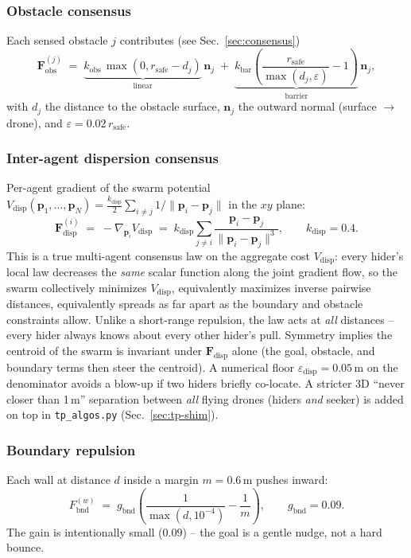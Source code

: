 \documentclass[11pt,a4paper]{article}
\newcommand{\code}[1]{\texttt{#1}}
\newcommand{\vect}[1]{\mathbf{#1}}
\begin{document}
\subsubsection*{Obstacle consensus}
Each sensed obstacle $j$ contributes (see Sec.~\ref{sec:consensus})
\[
    \vect{F}^{(j)}_\mathrm{obs} \;=\;
    \underbrace{k_\mathrm{obs}\,\max(0, r_\mathrm{safe} - d_j)}_{\text{linear}}
    \,\vect{n}_j
    \;+\;
    \underbrace{k_\mathrm{bar}\!\left(\frac{r_\mathrm{safe}}{\max(d_j,\varepsilon)} - 1\right)}_{\text{barrier}}
    \,\vect{n}_j,
\]
with $d_j$ the distance to the obstacle surface, $\vect{n}_j$ the outward
normal (surface $\to$ drone), and $\varepsilon = 0.02\,r_\mathrm{safe}$.

\subsubsection*{Inter-agent dispersion consensus}
\label{sec:disp-force}
Per-agent gradient of the swarm potential
$V_\mathrm{disp}(\vect{p}_1,\dots,\vect{p}_N) = \tfrac{k_\mathrm{disp}}{2}
\sum_{i \ne j} 1/\|\vect{p}_i - \vect{p}_j\|$ in the $xy$ plane:
\[
    \vect{F}^{(i)}_\mathrm{disp}
    \;=\; -\nabla_{\vect{p}_i} V_\mathrm{disp}
    \;=\; k_\mathrm{disp} \sum_{j \ne i}
          \frac{\vect{p}_i - \vect{p}_j}{\|\vect{p}_i - \vect{p}_j\|^{3}},
    \qquad k_\mathrm{disp} = 0.4.
\]
This is a true multi-agent consensus law on the aggregate cost $V_\mathrm{disp}$:
every hider's local law decreases the \emph{same} scalar function along the
joint gradient flow, so the swarm collectively minimizes $V_\mathrm{disp}$,
equivalently maximizes inverse pairwise distances, equivalently spreads as
far apart as the boundary and obstacle constraints allow. Unlike a
short-range repulsion, the law acts at \emph{all} distances -- every hider
always knows about every other hider's pull. Symmetry implies the centroid
of the swarm is invariant under $\vect{F}_\mathrm{disp}$ alone (the goal,
obstacle, and boundary terms then steer the centroid). A numerical floor
$\varepsilon_\mathrm{disp} = 0.05\,\text{m}$ on the denominator avoids a
blow-up if two hiders briefly co-locate. A stricter 3D ``never closer than
1\,m'' separation between \emph{all} flying drones (hiders \emph{and} seeker)
is added on top in \code{tp\_algos.py} (Sec.~\ref{sec:tp-shim}).

\subsubsection*{Boundary repulsion}
Each wall at distance $d$ inside a margin $m = 0.6\,\text{m}$ pushes inward:
\[
    F_\mathrm{bnd}^{(w)} \;=\;
    g_\mathrm{bnd}\!\left(\frac{1}{\max(d,10^{-4})} - \frac{1}{m}\right),
    \qquad g_\mathrm{bnd} = 0.09.
\]
The gain is intentionally small ($0.09$) -- the goal is a gentle nudge, not a
hard bounce.
\end{document}
